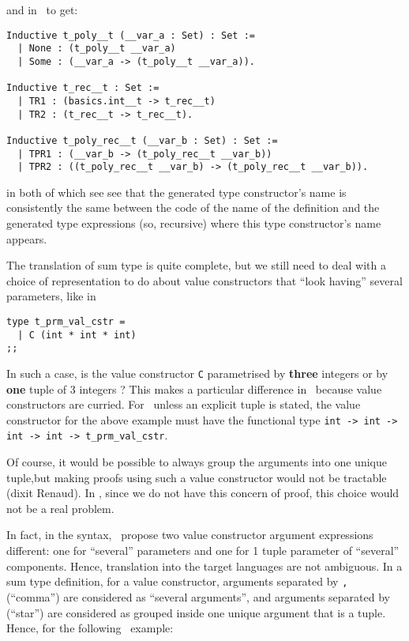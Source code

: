 \noindent and in \coq\ to get:

{\footnotesize
\begin{lstlisting}[language=MyCoq, title=Sum type generated in \coq]
Inductive t_poly__t (__var_a : Set) : Set := 
  | None : (t_poly__t __var_a)
  | Some : (__var_a -> (t_poly__t __var_a)).

Inductive t_rec__t : Set := 
  | TR1 : (basics.int__t -> t_rec__t)
  | TR2 : (t_rec__t -> t_rec__t).

Inductive t_poly_rec__t (__var_b : Set) : Set := 
  | TPR1 : (__var_b -> (t_poly_rec__t __var_b))
  | TPR2 : ((t_poly_rec__t __var_b) -> (t_poly_rec__t __var_b)).
\end{lstlisting}
}
in both of which see see that the generated type constructor's name is
consistently the same between the code of the name of the definition
and the generated type expressions (so, recursive) where this type
constructor's name appears.

\medskip
\label{sum-value-cstr-tuple-versus-several-args}
The translation of sum type is quite complete, but we still need to
deal with a choice of representation to do about value
constructors that ``look having'' several parameters, like in

{\footnotesize
\begin{lstlisting}[title=Value constructor parameterised by
  ``several'' arguments]
type t_prm_val_cstr =
  | C (int * int * int)
;;
\end{lstlisting}
}
In such a case, is the value constructor {\tt C} parametrised by
{\bf three} integers or by {\bf one} tuple of 3 integers ? This makes
a particular difference in \coq\ because value constructors are
curried. For \coq\, unless an explicit tuple is stated, the value
constructor for the above example must have the functional type
{\tt int -> int -> int -> int -> t\_prm\_val\_cstr}.

Of course, it would be possible to always group the arguments into one
unique tuple,but making proofs using such a value constructor would
not be tractable (dixit Renaud). In \ocaml, since we do not have this
concern of proof, this choice would not be a real problem.

In fact, in the syntax, \focalize\ propose two value constructor
argument expressions different: one for ``several'' parameters and one
for 1 tuple parameter of ``several'' components. Hence, translation
into the target languages are not ambiguous. In a sum type definition,
for a value constructor, arguments separated by {\tt ,} (``comma'')
are considered as ``several arguments'', and arguments separated by
{\tt *} (``star'') are considered as grouped inside one unique
argument that is a tuple. Hence, for the following \focalize\ example:

